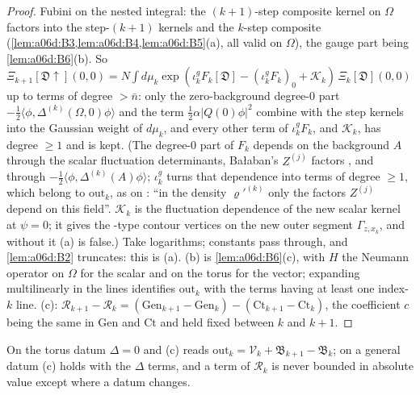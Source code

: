 \begin{proof}
Fubini on the nested integral: the $(k+1)$-step composite kernel on $\Omega$ factors into the step-$(k+1)$ kernels and the $k$-step composite (\cref{lem:a06d:B3,lem:a06d:B4,lem:a06d:B5}(a), all valid on $\Omega$), the gauge part being \cref{lem:a06d:B6}(b). So $\Xi_{k+1}[\mathfrak D\!\uparrow](0,0)=N\int d\mu_k\exp(\iota^g_kF_k[\mathfrak D]-(\iota^g_kF_k)_0+\mathcal K_k)\,\Xi_k[\mathfrak D](0,0)$ up to terms of degree $>\bar n$: only the zero-background degree-$0$ part $-\frac12\langle\phi,\Delta^{(k)}(\Omega,0)\phi\rangle$ and the term $\frac12\alpha|Q(0)\phi|^2$ combine with the step kernels into the Gaussian weight of $d\mu_k$, and every other term of $\iota^g_kF_k$, and $\mathcal K_k$, has degree $\ge1$ and is kept. (The degree-$0$ part of $F_k$ depends on the background $A$ through the scalar fluctuation determinants, Ba{\l}aban's $Z^{(j)}$ factors \cite[(2.52), (2.92), (2.105)]{Ba2}, and through $-\frac12\langle\phi,\Delta^{(k)}(A)\phi\rangle$; $\iota^g_k$ turns that dependence into terms of degree $\ge1$, which belong to $\mathrm{out}_k$, as on \cite[p.~576]{Ba2}: ``in the density $\varrho'^{(k)}$ only the factors $Z^{(j)}$ depend on this field''. $\mathcal K_k$ is the fluctuation dependence of the new scalar kernel at $\psi=0$; it gives the \cite[(1.12)]{Ba3}-type contour vertices on the new outer segment $\Gamma_{z,x_k}$, and without it (a) is false.) Take logarithms; constants pass through, and \cref{lem:a06d:B2} truncates: this is (a). (b) is \cref{lem:a06d:B6}(c), with $H$ the Neumann operator on $\Omega$ for the scalar and on the torus for the vector; expanding multilinearly in the lines identifies $\mathrm{out}_k$ with the terms having at least one index-$k$ line. (c): $\mathcal R_{k+1}-\mathcal R_k=(\mathrm{Gen}_{k+1}-\mathrm{Gen}_k)-(\mathrm{Ct}_{k+1}-\mathrm{Ct}_k)$, the coefficient $c$ being the same in $\mathrm{Gen}$ and $\mathrm{Ct}$ and held fixed between $k$ and $k+1$.
\end{proof}

On the torus datum $\Delta=0$ and (c) reads $\mathrm{out}_k=\mathcal V_k+\mathfrak B_{k+1}-\mathfrak B_k$; on a general datum (c) holds with the $\Delta$ terms, and a term of $\mathcal R_k$ is never bounded in absolute value except where a datum changes.

